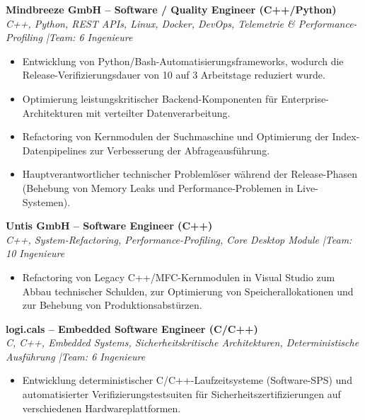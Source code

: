 \documentclass[10pt,a4paper]{article}
\begin{document}

\textbf{Mindbreeze GmbH -- Software / Quality Engineer (C++/Python)} \\
\textit{C++, Python, REST APIs, Linux, Docker, DevOps, Telemetrie \& Performance-Profiling \quad|\quad Team: 6 Ingenieure}
\begin{itemize}
    \item Entwicklung von Python/Bash-Automatisierungsframeworks, wodurch die Release-Verifizierungsdauer von 10 auf 3 Arbeitstage reduziert wurde.
    \item Optimierung leistungskritischer Backend-Komponenten für Enterprise-Architekturen mit verteilter Datenverarbeitung.
    \item Refactoring von Kernmodulen der Suchmaschine und Optimierung der Index-Datenpipelines zur Verbesserung der Abfrageausführung.
    \item Hauptverantwortlicher technischer Problemlöser während der Release-Phasen (Behebung von Memory Leaks und Performance-Problemen in Live-Systemen).
\end{itemize}

\vspace{0.15cm}
\textbf{Untis GmbH -- Software Engineer (C++)} \\
\textit{C++, System-Refactoring, Performance-Profiling, Core Desktop Module \quad|\quad Team: 10 Ingenieure}
\begin{itemize}
    \item Refactoring von Legacy C++/MFC-Kernmodulen in Visual Studio zum Abbau technischer Schulden, zur Optimierung von Speicherallokationen und zur Behebung von Produktionsabstürzen.
\end{itemize}

\vspace{0.15cm}
\textbf{logi.cals -- Embedded Software Engineer (C/C++)} \\
\textit{C, C++, Embedded Systems, Sicherheitskritische Architekturen, Deterministische Ausführung \quad|\quad Team: 6 Ingenieure}
\begin{itemize}
    \item Entwicklung deterministischer C/C++-Laufzeitsysteme (Software-SPS) und automatisierter Verifizierungstestsuiten für Sicherheitszertifizierungen auf verschiedenen Hardwareplattformen.
\end{itemize}
\end{document}
